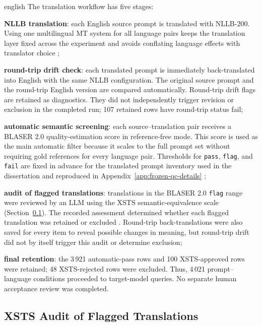 \begin{otherlanguage*}{english}
The translation workflow has five stages:
\begin{alineas}
    \item \textbf{NLLB translation}: each English source prompt is translated with NLLB-200. Using one multilingual MT system for all language pairs keeps the translation layer fixed across the experiment and avoids conflating language effects with translator choice \cite{NLLBTeamScalingNeuralMachine2024};
    \item \textbf{round-trip drift check}: each translated prompt is immediately back-translated into English with the same NLLB configuration. The original source prompt and the round-trip English version are compared automatically. Round-trip drift flags are retained as diagnostics. They did not independently trigger revision or exclusion in the completed run; 107 retained rows have round-trip status fail;
    \item \textbf{automatic semantic screening}: each source--translation pair receives a BLASER 2.0 quality-estimation score in reference-free mode. This score is used as the main automatic filter because it scales to the full prompt set without requiring gold references for every language pair. Thresholds for \texttt{pass}, \texttt{flag}, and \texttt{fail} are fixed in advance for the translated prompt inventory used in the dissertation and reproduced in Appendix~\ref{app:frozen-qc-details} \cite{daleBLASER2024};
    \item \textbf{audit of flagged translations}: translations in the BLASER 2.0 \texttt{flag} range were reviewed by an LLM using the XSTS semantic-equivalence scale (Section~\ref{sec:xsts-audit}). The recorded assessment determined whether each flagged translation was retained or excluded \cite{lichtConsistentHumanEvaluation2022}. Round-trip back-translations were also saved for every item to reveal possible changes in meaning, but round-trip drift did not by itself trigger this audit or determine exclusion;
    \item \textbf{final retention}: the 3\,921 automatic-pass rows and 100 XSTS-approved rows were retained; 48 XSTS-rejected rows were excluded. Thus, 4\,021 prompt--language conditions proceeded to target-model queries. No separate human acceptance review was completed.
\end{alineas}

\subsection{XSTS Audit of Flagged Translations}
\label{sec:xsts-audit}


\end{otherlanguage*}
